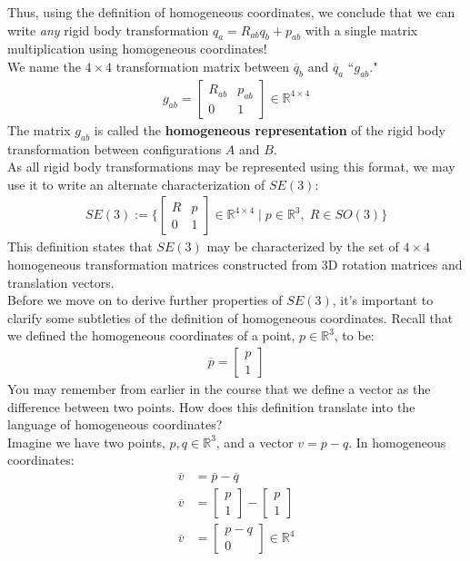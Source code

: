 \documentclass[oneside]{book}
\begin{document}
Thus, using the definition of homogeneous coordinates, we conclude that we can write \textit{any} rigid body transformation $q_a = R_{ab}q_b + p_{ab}$ with a single matrix multiplication using homogeneous coordinates!\\
We name the $4\times 4$ transformation matrix between $\overline{q}_b$ and $\overline{q}_a$ ``$g_{ab}$."
\begin{align}
    g_{ab} = 
    \begin{bmatrix}
        R_{ab} & p_{ab}\\
        0 & 1
    \end{bmatrix}
    \in \mathbb{R}^{4\times 4}
\end{align}
The matrix $g_{ab}$ is called the \textbf{homogeneous representation} of the rigid body transformation between configurations $A$ and $B$.\\
As all rigid body transformations may be represented using this format, we may use it to write an alternate characterization of $SE(3)$:
\begin{align}
    SE(3) := 
    \Big\{
    \begin{bmatrix}
        R & p\\
        0 & 1
    \end{bmatrix}
    \in \mathbb{R}^{4\times 4}
    \; |\;
    p\in \mathbb{R}^3,\; R\in SO(3) \Big\}
\end{align}
This definition states that $SE(3)$ may be characterized by the set of $4\times 4$ homogeneous transformation matrices constructed from 3D rotation matrices and translation vectors.\\
Before we move on to derive further properties of $SE(3)$, it's important to clarify some subtleties of the definition of homogeneous coordinates. Recall that we defined the homogeneous coordinates of a point, $p\in \mathbb{R}^3$, to be:
\begin{align}
    \overline{p}
    = \begin{bmatrix}
        p\\
        1
    \end{bmatrix}
\end{align}
You may remember from earlier in the course that we define a vector as the difference between two points. How does this definition translate into the language of homogeneous coordinates?\\
Imagine we have two points, $p, q \in \mathbb{R}^3$, and a vector $v = p - q$. In homogeneous coordinates:
\begin{align}
    \overline{v} &= \overline{p} - \overline{q}\\
    \overline{v} &= \begin{bmatrix}
        p\\
        1
    \end{bmatrix} 
    - \begin{bmatrix}
        p\\
        1
    \end{bmatrix}\\
    \overline{v} &= 
    \begin{bmatrix}
        p-q\\
        0
    \end{bmatrix} \in \mathbb{R}^4
\end{align}
\end{document}
